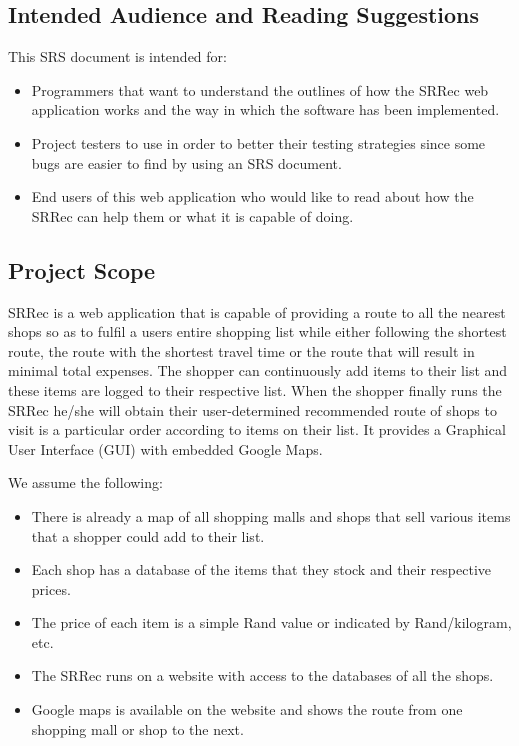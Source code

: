 \documentclass[10pt, a4paper, twocolumn]{scrartcl}
\begin{document}
		\subsection{Intended Audience and Reading Suggestions}
		
			This SRS document is intended for:
			\begin{itemize}
				\item Programmers that want to understand the outlines of how the SRRec web application works and the way in which the software has been implemented.
				\item Project testers to use in order to better their testing strategies since some bugs are easier to find by using an SRS document.
				\item End users of this web application who would like to read about how the SRRec can help them or what it is capable of doing.
			\end{itemize}
		
		\subsection{Project Scope}
		
			SRRec is a web application that is capable of providing a route to all the nearest shops so as to fulfil a users entire shopping list while either following the shortest route, the route with the shortest travel time or the route that will result in minimal total expenses. The shopper can continuously add items to their list and these items are logged to their respective list. When the shopper finally runs the SRRec he/she will obtain their user-determined recommended route of shops to visit is a particular order according to items on their list. It provides a Graphical User Interface (GUI) with embedded Google Maps.
		
			We assume the following:
			\begin{itemize}
				\item There is already a map of all shopping malls and shops that sell various items that a shopper could add to their list.
				\item Each shop has a database of the items that they stock and their respective prices.
				\item The price of each item is a simple Rand value or indicated by Rand/kilogram, etc.
				\item The SRRec runs on a website with access to the databases of all the shops.
				\item Google maps is available on the website and shows the route from one shopping mall or shop to the next.
			\end{itemize}
		
\end{document}
